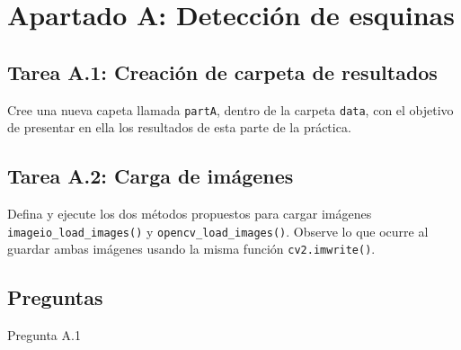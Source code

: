 \chapter{Apartado A: \textbf{Detección de esquinas}}
\label{chapter:tarea_a}


\section*{Tarea A.1: Creación de carpeta de resultados}
{}

Cree una nueva capeta llamada \texttt{partA}, dentro de la carpeta \texttt{data}, con el objetivo de presentar en ella los resultados de esta parte de la práctica.

\section*{Tarea A.2: Carga de imágenes}

Defina y ejecute los dos métodos propuestos para cargar imágenes \texttt{imageio\_load\_images()} y \texttt{opencv\_load\_images()}. Observe lo que ocurre al guardar ambas imágenes usando la misma función \texttt{cv2.imwrite()}.

\section*{Preguntas}

\vspace{5mm}
\begin{tcolorbox}[colback=gray!10, colframe=gray!30, coltitle=black, title=Pregunta A.1, halign=left]
Pregunta A.1
\end{tcolorbox}